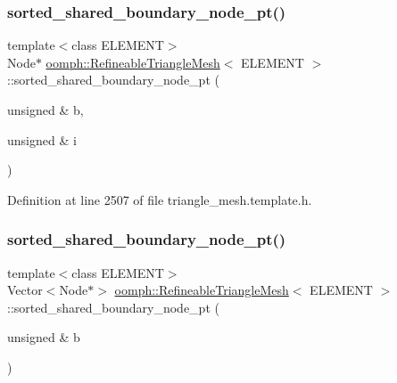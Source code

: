 \subsubsection{\texorpdfstring{sorted\+\_\+shared\+\_\+boundary\+\_\+node\+\_\+pt()}{sorted\_shared\_boundary\_node\_pt()}\hspace{0.1cm}{\footnotesize\ttfamily [1/2]}}
{\footnotesize\ttfamily template$<$class E\+L\+E\+M\+E\+NT$>$ \\
Node$\ast$ \hyperlink{classoomph_1_1RefineableTriangleMesh}{oomph\+::\+Refineable\+Triangle\+Mesh}$<$ E\+L\+E\+M\+E\+NT $>$\+::sorted\+\_\+shared\+\_\+boundary\+\_\+node\+\_\+pt (\begin{DoxyParamCaption}\item[{unsigned \&}]{b,  }\item[{unsigned \&}]{i }\end{DoxyParamCaption})\hspace{0.3cm}{\ttfamily [inline]}}



Definition at line 2507 of file triangle\+\_\+mesh.\+template.\+h.

\mbox{\label{classoomph_1_1RefineableTriangleMesh_a99f0a509d5e79e97129a6aa66644f0b7}} 
\subsubsection{\texorpdfstring{sorted\+\_\+shared\+\_\+boundary\+\_\+node\+\_\+pt()}{sorted\_shared\_boundary\_node\_pt()}\hspace{0.1cm}{\footnotesize\ttfamily [2/2]}}
{\footnotesize\ttfamily template$<$class E\+L\+E\+M\+E\+NT$>$ \\
Vector$<$Node$\ast$$>$ \hyperlink{classoomph_1_1RefineableTriangleMesh}{oomph\+::\+Refineable\+Triangle\+Mesh}$<$ E\+L\+E\+M\+E\+NT $>$\+::sorted\+\_\+shared\+\_\+boundary\+\_\+node\+\_\+pt (\begin{DoxyParamCaption}\item[{unsigned \&}]{b }\end{DoxyParamCaption})\hspace{0.3cm}{\ttfamily [inline]}}



